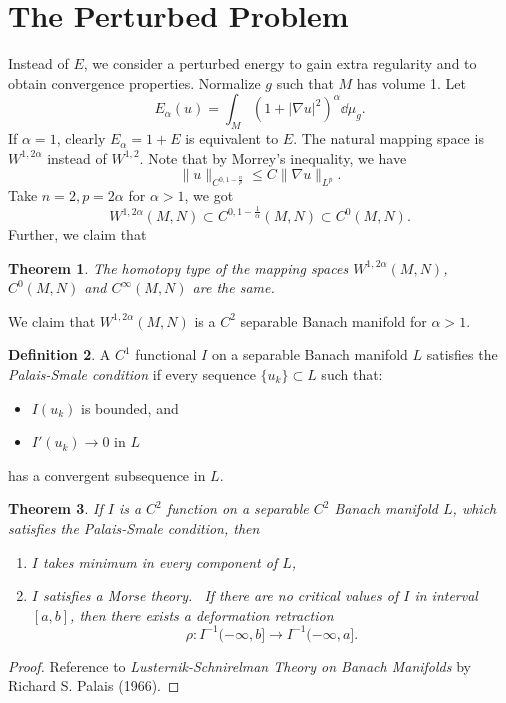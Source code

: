 \documentclass[UTF8,12pt]{article}
\theoremstyle{plain}\newtheorem{theorem}{Theorem}
\theoremstyle{definition}\newtheorem{definition}[theorem]{Definition}
\theoremstyle{definition}\newtheorem{example}[theorem]{Example}
\theoremstyle{plain}\newtheorem{axiom}[theorem]{Axiom}
\theoremstyle{plain}\newtheorem{assertion}[theorem]{Assertion}
\theoremstyle{plain}\newtheorem{corollary}[theorem]{Corollary}
\theoremstyle{plain}\newtheorem{lemma}[theorem]{Lemma}
\theoremstyle{plain}\newtheorem{proposition}[theorem]{Proposition}
\theoremstyle{plain}\newtheorem{prop}[theorem]{Proposition}
\theoremstyle{plain}\newtheorem{conjecture}[theorem]{Conjecture}
\theoremstyle{plain}\newtheorem{conj}[theorem]{Conjecture}
\theoremstyle{plain}\newtheorem{problem}[theorem]{Problem}
\theoremstyle{remark}\newtheorem{notation}[theorem]{Notation}
\theoremstyle{definition}\newtheorem*{question}{Question}
\theoremstyle{definition}\newtheorem*{answer}{Answer}
\theoremstyle{definition}\newtheorem*{goal}{Goal}
\theoremstyle{plain}\newtheorem*{application}{Application}
\theoremstyle{plain}\newtheorem*{exercise}{Exercise}
\theoremstyle{remark}\newtheorem*{remark}{Remark}
\theoremstyle{remark}\newtheorem*{note}{\small{Note}}
\numberwithin{equation}{section}
\numberwithin{theorem}{section}
\numberwithin{figure}{section}
\begin{document}
\section{The Perturbed Problem}
Instead of \(E\), we consider a perturbed energy to gain extra regularity and to
obtain convergence properties. Normalize \(g\) such that \(M\) has volume 1. Let \[
    E_\alpha(u)=\int_{M}(1+|\nabla u|^2)^{\alpha}\dd{\mu_g}
.\] If \(\alpha=1\), clearly \(E_\alpha=1+E\) is equivalent to \(E\). The natural
mapping space is \(W^{1,2\alpha}\) instead of \(W^{1,2}\). Note that by Morrey's
inequality, we have \[
    \|u\|_{C^{0,1-\frac{n}{p}}}\le C\|\nabla u\|_{L^p}
.\] Take \(n=2,p=2\alpha\) for \(\alpha>1\), we got \[
    W^{1,2\alpha}(M,N)\subset C^{0,1-\frac{1}{\alpha}}(M,N)\subset C^0(M,N)
.\] Further, we claim that
\begin{theorem}
    The homotopy type of the mapping spaces \(W^{1,2\alpha}(M,N)\), \(C^0(M,N)\) and
    \(C^\infty(M,N)\) are the same.
\end{theorem}
We claim that \(W^{1,2\alpha}(M,N)\) is a \(C^2\) separable Banach manifold for
\(\alpha>1\).
\begin{definition}
    A \(C^1\) functional \(I\) on a separable Banach manifold \(L\) satisfies the
    \emph{Palais-Smale condition} if every sequence \(\{u_k\}\subset L\) such that:
    \begin{itemize}
    \item \(I(u_k)\) is bounded, and 
    \item \(I'(u_k)\to 0\) in \(L\)
    \end{itemize}
    has a convergent subsequence in \(L\).
\end{definition}
\begin{theorem}\label{thm:ps-critical}
    If \(I\) is a \(C^2\) function on a separable \(C^2\) Banach manifold \(L\), which
    satisfies the Palais-Smale condition, then 
    \begin{enumerate}[(1)]
    \item \(I\) takes minimum in every component of \(L\),
    \item \(I\) satisfies a Morse theory. \ie\ If there are no critical values of
        \(I\) in interval \([a,b]\), then there exists a deformation retraction \[
            \rho\colon I^{-1}(-\infty,b]\longrightarrow I^{-1}(-\infty,a]
        .\] 
    \end{enumerate}
\end{theorem}
\begin{proof}
    Reference to \emph{Lusternik-Schnirelman Theory on Banach Manifolds} by
    Richard S. Palais (1966).
\end{proof}
\end{document}
